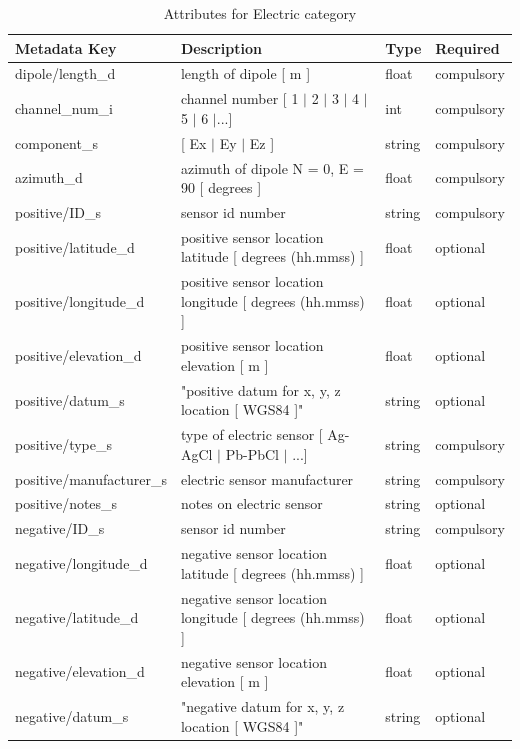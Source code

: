 \documentclass{article}
\begin{document}
\begin{table}[htb!]
	\caption[Attributes for Electric Channel]{Attributes for Electric category}
	\begin{tabular}{|l|p{3in}|l|l|}
		\hline
		\textbf{Metadata Key} & \textbf{Description} & \textbf{Type} & \textbf{Required} \\ \hline
		dipole/length\_d & length of dipole [ m ] & float & compulsory \\ \hline
		channel\_num\_i & channel number [ 1 $|$ 2 $|$ 3 $|$ 4 $|$ 5 $|$ 6 $|$...] & int & compulsory \\ \hline
		component\_s & [ Ex $|$ Ey $|$ Ez ] & string  & compulsory \\ \hline
		azimuth\_d & azimuth of dipole N = 0,  E = 90 [ degrees ] & float & compulsory \\ \hline
		positive/ID\_s & sensor id number & string & compulsory \\ \hline
		positive/latitude\_d & positive sensor location latitude [ degrees (hh.mmss) ] & float & optional \\ \hline
		positive/longitude\_d & positive sensor location longitude [ degrees (hh.mmss) ] & float & optional \\ \hline
		positive/elevation\_d & positive sensor location elevation [ m ] & float & optional \\ \hline
		positive/datum\_s & "positive datum for x, y, z location [ WGS84 ]" & string & optional \\ \hline
		positive/type\_s & type of electric sensor [ Ag-AgCl $|$ Pb-PbCl $|$ ...] & string & compulsory \\ \hline
		positive/manufacturer\_s & electric sensor manufacturer & string & compulsory \\ \hline
		positive/notes\_s & notes on electric sensor & string & optional \\ \hline
		negative/ID\_s & sensor id number & string & compulsory \\ \hline
		negative/longitude\_d & negative sensor location latitude [ degrees (hh.mmss) ] & float & optional \\ \hline
		negative/latitude\_d & negative sensor location longitude [ degrees (hh.mmss) ] & float & optional \\ \hline
		negative/elevation\_d & negative sensor location elevation [ m ] & float & optional \\ \hline
		negative/datum\_s & "negative datum for x, y, z location [ WGS84 ]" & string & optional \\ \hline

\end{tabular}
\end{table}
\end{document}
